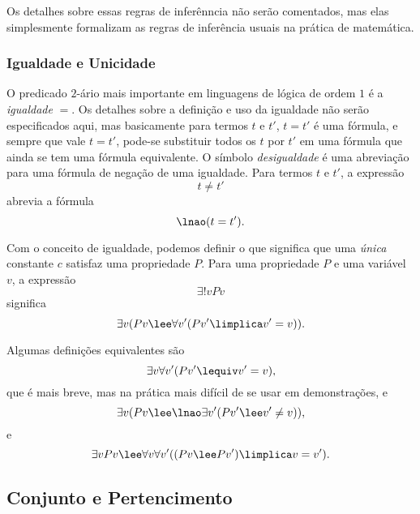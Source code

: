 Os detalhes sobre essas regras de inferênncia não serão comentados, mas elas simplesmente formalizam as regras de inferência usuais na prática de matemática.

\subsubsection{Igualdade e Unicidade}

O predicado $2$-ário mais importante em linguagens de lógica de ordem $1$ é a \emph{igualdade} $=$. Os detalhes sobre a definição e uso da igualdade não serão especificados aqui, mas basicamente para termos $t$ e $t'$, $t=t'$ é uma fórmula, e sempre que vale $t=t'$, pode-se substituir todos os $t$ por $t'$ em uma fórmula que ainda se tem uma fórmula equivalente. O símbolo \emph{desigualdade} é uma abreviação para uma fórmula de negação de uma igualdade. Para termos $t$ e $t'$, a expressão
	\begin{equation*}
	t \neq t'
	\end{equation*}
abrevia a fórmula
	\begin{equation*}
	\lnao(t = t').
	\end{equation*}

Com o conceito de igualdade, podemos definir o que significa que uma \emph{única} constante $c$ satisfaz uma propriedade $P$. Para uma propriedade $P$ e uma variável $v$, a expressão
	\begin{equation*}
	\exists!v Pv
	\end{equation*}
significa
	\begin{equation*}
	\exists v (Pv \lee \forall v'(Pv' \limplica v' = v)).
	\end{equation*}

Algumas definições equivalentes são
	\begin{equation*}
	\exists v \forall v' (Pv' \lequiv v'=v),
	\end{equation*}
que é mais breve, mas na prática mais difícil de se usar em demonstrações, e
	\begin{equation*}
	\exists v (Pv \lee \lnao\exists v'(Pv' \lee v' \neq v)),
	\end{equation*}
e
	\begin{equation*}
	\exists v Pv \lee \forall v \forall v' ((Pv \lee Pv') \limplica v=v').
	\end{equation*}

\subsection{Conjunto e Pertencimento}

